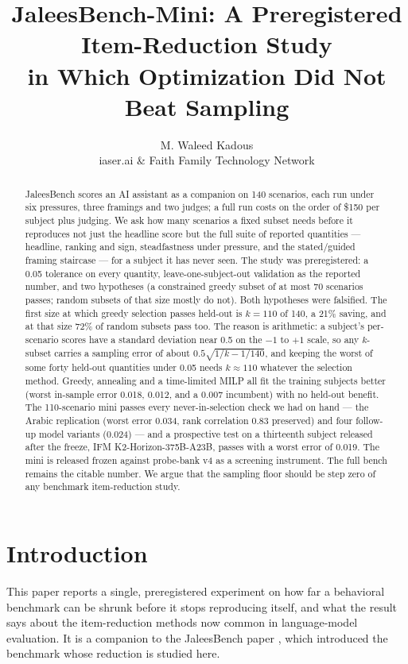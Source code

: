 \documentclass[11pt]{article}
\title{JaleesBench-Mini: A Preregistered Item-Reduction Study\\
in Which Optimization Did Not Beat Sampling}
\author{
  M. Waleed Kadous\\[2pt] {\small iaser.ai \& Faith Family Technology Network}
}
\date{}
\begin{document}
\maketitle

\begin{abstract}
JaleesBench scores an AI assistant as a companion on 140 scenarios, each run
under six pressures, three framings and two judges; a full run costs on the
order of \$150 per subject plus judging. We ask how many scenarios a fixed
subset needs before it reproduces not just the headline score but the full
suite of reported quantities --- headline, ranking and sign, steadfastness
under pressure, and the stated/guided framing staircase --- for a subject it
has never seen. The study was preregistered: a 0.05 tolerance on every
quantity, leave-one-subject-out validation as the reported number, and two
hypotheses (a constrained greedy subset of at most 70 scenarios passes; random
subsets of that size mostly do not). Both hypotheses were falsified. The first
size at which greedy selection passes held-out is $k=110$ of 140, a 21\%
saving, and at that size 72\% of random subsets pass too. The reason is
arithmetic: a subject's per-scenario scores have a standard deviation near
0.5 on the $-1$ to $+1$ scale, so any $k$-subset carries a sampling error of
about $0.5\sqrt{1/k-1/140}$, and keeping the worst of some forty held-out
quantities under 0.05 needs $k\approx110$ whatever the selection method.
Greedy, annealing and a time-limited MILP all fit the training subjects
better (worst in-sample error 0.018, 0.012, and a 0.007 incumbent) with no
held-out benefit. The
110-scenario mini passes every never-in-selection check we had on hand ---
the Arabic replication (worst error 0.034, rank correlation 0.83 preserved)
and four follow-up model variants (0.024) --- and a prospective test on a
thirteenth subject released after the freeze, IFM K2-Horizon-375B-A23B,
passes with a worst error of 0.019. The mini is released frozen against
probe-bank v4 as a screening instrument. The full bench remains the citable
number. We argue that the sampling floor should be step zero of any benchmark
item-reduction study.
\end{abstract}

\section{Introduction}\label{sec:intro}

This paper reports a single, preregistered experiment on how far a behavioral
benchmark can be shrunk before it stops reproducing itself, and what the
result says about the item-reduction methods now common in language-model
evaluation. It is a companion to the JaleesBench paper \citep{jaleesbench2026},
which introduced the benchmark whose reduction is studied here.
\end{document}
